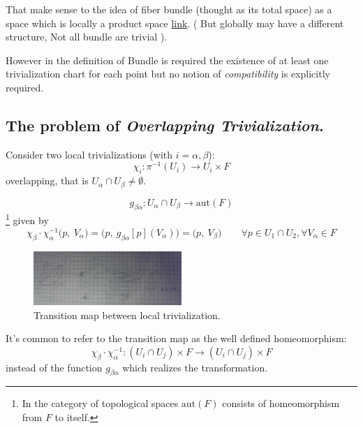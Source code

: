 \documentclass[a4paper,12pt]{scrartcl}    %
\begin{document}
That make sense to the idea of fiber bundle (thought as its total space) as a space which is locally a product space
\href{http://en.wikipedia.org/wiki/Vector_bundle#mediaviewer/File:Moebiusstrip.png}{link}.
( But globally may have a different structure, Not all bundle are trivial ).

However in the definition of Bundle is required the existence of at least one trivialization chart  for each point but no notion of \emph{compatibility} is explicitly required.

\subsection{The problem of \emph{Overlapping Trivialization}.}

Consider two local trivializations (with $ i = \alpha, \beta$):
\begin{displaymath}
\chi_{i} : \pi^{-1} (U_{i}) \rightarrow U_{i} \times F
\end{displaymath}
overlapping, that is $ U_{\alpha} \cap U_{\beta} \neq \emptyset$.

\begin{definition}
\begin{displaymath}
g_{ \beta \alpha}: U_{\alpha} \cap U_{\beta} \rightarrow	\textrm{aut}(F)
\end{displaymath}\footnote{In the category of topological spaces $\textrm{aut}(F) $ consists of homeomorphism from $F$ to itself.}
given by
\begin{displaymath}
\chi_{\beta} \cdot \chi_{\alpha}^{-1} \big(p, \: V_{\alpha}\big) = \big( p, \: g_{ \beta \alpha} [p] (V_{\alpha}) \big )= \big(p, \:  V_{\beta} \big) \qquad \forall p \in U_{1} \cap U_{2} , \forall V_{\alpha} \in F
\end{displaymath}
\end{definition}

\begin{figure}[h!]
  \caption{Transition map between local trivialization.}
  	\includegraphics[width=0.5\textwidth]{TempPictures/TransitionMap.jpg}
  \centering
\end{figure}

\begin{notationfix}
It's common to refer to the transition map as the well defined homeomorphism:
\begin{displaymath}
\chi_{\beta} \cdot \chi_{\alpha}^{-1} :  ( U_{i} \cap U_{j} ) \times F   \rightarrow ( U_{i} \cap U_{j} ) \times F
\end{displaymath}
instead of the function $g_{ \beta \alpha}$ which realizes the transformation.
\end{notationfix}
\end{document}
